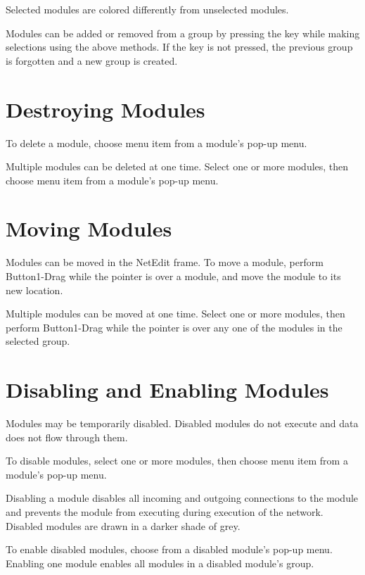 Selected modules are colored differently from unselected modules.

Modules can be added or removed from a group by pressing the
 key while making selections using the above
methods.  If the  key is not pressed, the previous
group is forgotten and a new group is created.

\section{Destroying Modules}
\label{sec:destroymod}

To delete a module, choose menu item  from a module's
pop-up menu.

Multiple modules can be deleted at one time. Select one or more
modules, then choose menu item  from a module's
pop-up menu.

\section{Moving Modules}
\label{sec:movemod}

Modules can be moved in the NetEdit frame.  To move a module, perform
Button1-Drag while the pointer is over a module, and move the module
to its new location.

Multiple modules can be moved at one time.  Select one or more
modules, then perform Button1-Drag while the pointer is over any one
of the modules in the selected group.

\section{Disabling and Enabling Modules}
\label{sec:disablemod}

Modules may be temporarily disabled.  Disabled modules do not execute
and data does not flow through them.

To disable modules, select one or more modules, then
choose menu item  from a module's pop-up menu.

Disabling a module disables all incoming and outgoing connections to
the module and prevents the module from executing during execution of
the network. Disabled modules are drawn in a darker shade of grey.

To enable disabled modules, choose  from a disabled
module's pop-up menu.  Enabling one module enables all modules in a
disabled module's group.

